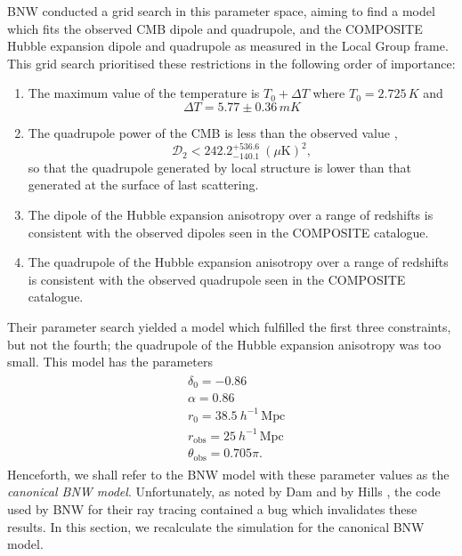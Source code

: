 \documentclass[a4paper,12pt]{report}
\begin{document}
BNW \cite{RN3} conducted a grid search in this parameter space, aiming to find a model which fits the observed CMB dipole and quadrupole, and the COMPOSITE Hubble expansion dipole and quadrupole as measured in the Local Group frame. This grid search prioritised these restrictions in the following order of importance:
\begin{enumerate}
    \item The maximum value of the temperature is $T_0 + \Delta T$ where $T_0 = 2.725\, \si{K}$ and
    \begin{equation}
        \Delta T = 5.77 \pm 0.36\, \si{mK}
    \end{equation}

    \item The quadrupole power of the CMB is less than the observed value \cite{RN175},
    \begin{equation}
        \mathcal{D}_2 < 242.2^{+536.6}_{-140.1}\: (\mu\text{K})^2,
    \end{equation}
    so that the quadrupole generated by local structure is lower than that generated at the surface of last scattering.

    \item The dipole of the Hubble expansion anisotropy over a range of redshifts is consistent with the observed dipoles seen in the COMPOSITE catalogue.

    \item The quadrupole of the Hubble expansion anisotropy over a range of redshifts is consistent with the observed quadrupole seen in the COMPOSITE catalogue.
\end{enumerate}
Their parameter search yielded a model which fulfilled the first three constraints, but not the fourth; the quadrupole of the Hubble expansion anisotropy was too small. This model has the parameters
\begin{align}
    \begin{split}\label{eqn: canonical BNW model parameters}
        &\delta_0 = -0.86 \\
        &\alpha = 0.86 \\
        &r_0 = 38.5\: h^{-1}\,\text{Mpc} \\
        &r_{\text{obs}} = 25\: h^{-1}\,\text{Mpc} \\
        &\theta_{\text{obs}} = 0.705 \pi.
    \end{split}
\end{align}
Henceforth, we shall refer to the BNW model with these parameter values as the \textit{canonical BNW model}. Unfortunately, as noted by Dam \cite{RN6} and by Hills \cite{RN42}, the code used by BNW for their ray tracing contained a bug which invalidates these results. In this section, we recalculate the simulation for the canonical BNW model.
\end{document}
